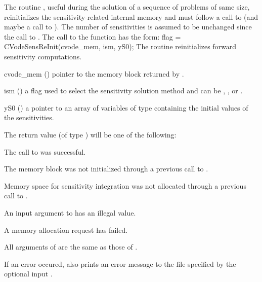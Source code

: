 The routine , useful during the solution of a sequence of problems of 
same size, reinitializes the sensitivity-related internal memory 
and must follow a call to  (and maybe a call to ). 
The number  of sensitivities is assumed to be unchanged since the call to 
.
The call to the  function has the form:
{
  flag = CVodeSensReInit(cvode\_mem, ism, yS0);
}
{
  The routine  reinitializes forward sensitivity computations.
}
{
  \begin{args}

  \item[cvode\_mem] ()
    pointer to the {\cvodes} memory block returned by .

  \item[ism] ()
    a flag used to select the sensitivity solution method and can 
    be , , or .

  \item[yS0] () 
    a pointer to an array of  variables of type  containing the 
    initial values of the sensitivities.

  \end{args}
}
{
  The return value  (of type ) will be one of the following:
  \begin{args}
  \item[\Id{CV\_SUCCESS}]
    The call to  was successful.
  \item[\Id{CV\_MEM\_NULL}] 
    The {\cvodes} memory block was not initialized through a 
    previous call to .
  \item[\Id{CV\_NO\_SENS}]
    Memory space for sensitivity integration was not allocated through a 
    previous call to .
  \item[\Id{CV\_ILL\_INPUT}] 
    An input argument to  has an illegal value.    
  \item[\Id{CV\_MEM\_FAIL}] 
    A memory allocation request has failed.
  \end{args}
}
{
  All arguments of  are the same as those of
  .

  If an error occured,  also prints an error message to the
  file specified by the optional input .
}
